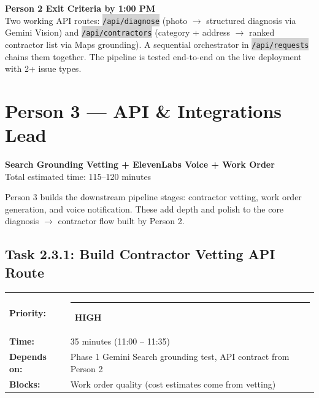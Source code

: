 \documentclass[11pt, a4paper]{article}
\newcommand{\highpri}{\textcolor{highamber}{\rule{6pt}{6pt}}~\textcolor{highamber}{\scriptsize\textbf{HIGH}}}
\newcommand{\code}[1]{\texttt{\small\colorbox{lightgray}{#1}}}
\begin{document}
\vspace{0.5em}

\begin{milestonebox}
\textbf{Person 2 Exit Criteria by 1:00 PM}\\[4pt]
Two working API routes: \code{/api/diagnose} (photo $\rightarrow$ structured diagnosis via Gemini Vision) and \code{/api/contractors} (category + address $\rightarrow$ ranked contractor list via Maps grounding). A sequential orchestrator in \code{/api/requests} chains them together. The pipeline is tested end-to-end on the live deployment with 2+ issue types.
\end{milestonebox}

\newpage

\section{Person 3 --- API \& Integrations Lead}
\begin{center}
\textcolor{medpurple}{\large\textbf{Search Grounding Vetting + ElevenLabs Voice + Work Order}}\\[2pt]
\textcolor{textmuted}{\small Total estimated time: 115--120 minutes}
\end{center}

\vspace{0.5em}

Person 3 builds the downstream pipeline stages: contractor vetting, work order generation, and voice notification. These add depth and polish to the core diagnosis $\rightarrow$ contractor flow built by Person 2.

\vspace{0.5em}

\subsection{Task 2.3.1: Build Contractor Vetting API Route}

\begin{tabularx}{\textwidth}{lX}
\textbf{Priority:} & \highpri \\
\textbf{Time:} & 35 minutes (11:00 -- 11:35) \\
\textbf{Depends on:} & Phase 1 Gemini Search grounding test, API contract from Person 2 \\
\textbf{Blocks:} & Work order quality (cost estimates come from vetting) \\
\end{tabularx}
\end{document}
